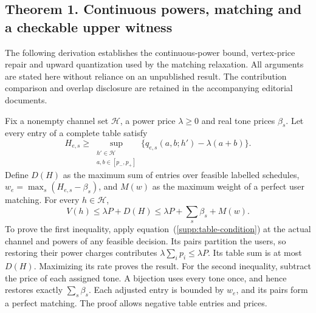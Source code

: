 \documentclass[10pt,letterpaper]{article}
\begin{document}
\subsection{Theorem 1. Continuous powers, matching and a checkable upper witness}
The following derivation establishes the continuous-power bound, vertex-price repair and upward quantization used by the matching relaxation. All arguments are stated here without reliance on an unpublished result. The contribution comparison and overlap disclosure are retained in the accompanying editorial documents.

Fix a nonempty channel set $\mathcal H$, a power price $\lambda\ge0$ and real tone prices $\beta_s$. Let every entry of a complete table satisfy
\begin{equation}
 H_{e,s}\ge\sup_{\substack{h'\in\mathcal H\\a,b\in[p_-,p_+]}}
          \{q_{e,s}(a,b;h')-\lambda(a+b)\}.
 \label{supp:table-condition}
\end{equation}
Define $D(H)$ as the maximum sum of entries over feasible labelled schedules,
$w_e=\max_s(H_{e,s}-\beta_s)$, and $M(w)$ as the maximum weight of a perfect user matching. For every $h\in\mathcal H$,
\begin{equation}
 V(h)\le\lambda P+D(H)
       \le\lambda P+\sum_s\beta_s+M(w).
 \label{supp:theorem1}
\end{equation}
To prove the first inequality, apply equation~(\ref{supp:table-condition}) at the actual channel and powers of any feasible decision. Its pairs partition the users, so restoring their power charges contributes $\lambda\sum_i p_i\le\lambda P$. Its table sum is at most $D(H)$. Maximizing its rate proves the result. For the second inequality, subtract the price of each assigned tone. A bijection uses every tone once, and hence restores exactly $\sum_s\beta_s$. Each adjusted entry is bounded by $w_e$, and its pairs form a perfect matching. The proof allows negative table entries and prices.
\end{document}
